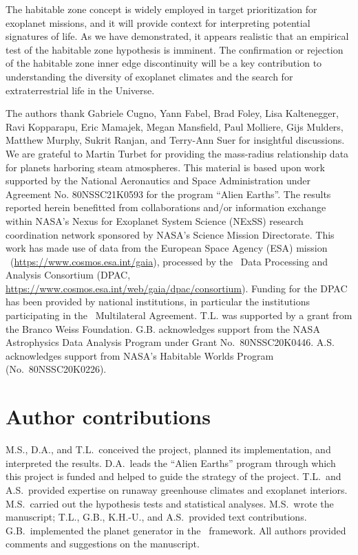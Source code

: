 \documentclass[twocolumn,twocolappendix]{aastex631}
\begin{document}
The habitable zone concept is widely employed in target prioritization for exoplanet missions, and it will provide context for interpreting potential signatures of life.
As we have demonstrated, it appears realistic that an empirical test of the habitable zone hypothesis is imminent.
The confirmation or rejection of the habitable zone inner edge discontinuity will be a key contribution to understanding the diversity of exoplanet climates and the search for extraterrestrial life in the Universe.

\begin{acknowledgments}
The authors thank Gabriele Cugno, Yann Fabel, Brad Foley, Lisa Kaltenegger, Ravi Kopparapu, Eric Mamajek, Megan Mansfield, Paul Molliere, Gijs Mulders, Matthew Murphy, Sukrit Ranjan, and Terry-Ann Suer for insightful discussions.
We are grateful to Martin Turbet for providing the mass-radius relationship data for planets harboring steam atmospheres.
This material is based upon work supported by the National Aeronautics and Space Administration under Agreement No. 80NSSC21K0593 for the program ``Alien Earths''.
The results reported herein benefitted from collaborations and/or information exchange within NASA’s Nexus for Exoplanet System Science (NExSS) research coordination network sponsored by NASA’s Science Mission Directorate.
This work has made use of data from the European Space Agency (ESA) mission \gaia\ (\url{https://www.cosmos.esa.int/gaia}), processed by the \gaia\ Data Processing and Analysis Consortium (DPAC, \url{https://www.cosmos.esa.int/web/gaia/dpac/consortium}). Funding for the DPAC has been provided by national institutions, in particular the institutions participating in the \gaia\ Multilateral Agreement.
T.L. was supported by a grant from the Branco Weiss Foundation.
G.B. acknowledges support from the NASA Astrophysics Data Analysis Program under Grant No.~80NSSC20K0446.
A.S. acknowledges support from NASA's Habitable Worlds Program (No.~80NSSC20K0226).
\end{acknowledgments}

\section*{Author contributions}
M.S., D.A., and T.L.\ conceived the project, planned its implementation, and interpreted the results.
D.A.\ leads the ``Alien Earths'' program through which this project is funded and helped to guide the strategy of the project.
T.L.\ and A.S.\ provided expertise on runaway greenhouse climates and exoplanet interiors.
M.S.\ carried out the hypothesis tests and statistical analyses.
M.S.\ wrote the manuscript; T.L., G.B., K.H.-U., and A.S.\ provided text contributions.
G.B.\ implemented the planet generator in the \bioverse\ framework.
All authors provided comments and suggestions on the manuscript.
\end{document}
